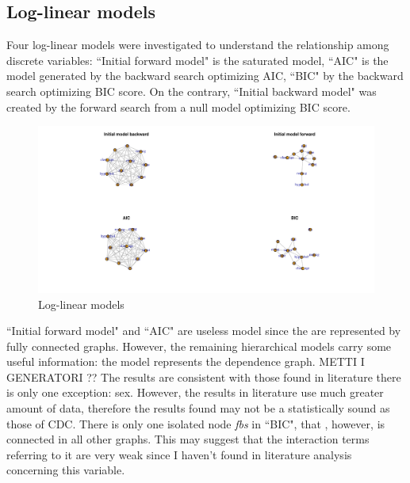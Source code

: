 \documentclass{article}
\begin{document}
\subsection{Log-linear models}
Four log-linear models were investigated to understand the relationship among discrete variables: ``Initial forward model" is the saturated model, ``AIC" is the model generated by the backward search optimizing AIC, ``BIC" by the backward search optimizing BIC score. On the contrary, ``Initial backward model" was created by the forward search from a null model optimizing BIC score.
\begin{figure}[H]
       \centering
       \includegraphics[width=1\textwidth]{Log-linear discrete results.pdf}
       \caption{Log-linear models}
\end{figure}
``Initial forward model" and ``AIC" are useless model since the are represented by fully connected graphs. However, the remaining hierarchical models carry some useful information: the model represents the dependence graph.   METTI I GENERATORI ??
The results are consistent with those found in literature there is only one exception: sex. However, the results in literature use much greater amount of  data, therefore the results found may not be a statistically sound as those of CDC.
There is only one isolated node \textit{fbs} in ``BIC", that , however, is connected in all other graphs. This may suggest that the interaction terms referring to it are very weak since I haven't found in literature analysis concerning this variable. \\
\end{document}

